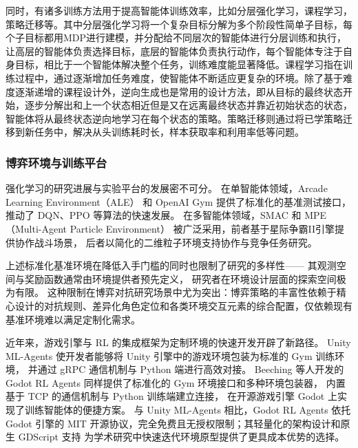 \documentclass[12pt, a4paper, UTF8]{ctexart}
\numberwithin{equation}{section}
\begin{document}
同时，有诸多训练方法用于提高智能体训练效率，比如分层强化学习\cite{10120651hierarchical}，课程学习\cite{2009Curriculum}，策略迁移\cite{Tseng2022OfflineMR}等。其中分层强化学习将一个复杂目标分解为多个阶段性简单子目标，每个子目标都用MDP进行建模，并分配给不同层次的智能体进行分层训练和执行，让高层的智能体负责选择目标，底层的智能体负责执行动作，每个智能体专注于自身目标，相比于一个智能体解决整个任务，训练难度能显著降低。课程学习指在训练过程中，通过逐渐增加任务难度，使智能体不断适应更复杂的环境。除了基于难度逐渐递增的课程设计外，逆向生成也是常用的设计方法，即从目标的最终状态开始，逐步分解出和上一个状态相近但是又在远离最终状态并靠近初始状态的状态，智能体将从最终状态逆向地学习在每个状态的策略。策略迁移则通过将已学策略迁移到新任务中，解决从头训练耗时长，样本获取率和利用率低等问题。

\subsubsection{博弈环境与训练平台}

强化学习的研究进展与实验平台的发展密不可分。
在单智能体领域，Arcade Learning Environment（ALE）\cite{bellemare2013arcade} 和
OpenAI Gym\cite{1606.01540Gym} 提供了标准化的基准测试接口，
推动了 DQN、PPO 等算法的快速发展。
在多智能体领域，SMAC\cite{samvelyan2019starcraftmultiagentchallenge}
和 MPE（Multi-Agent Particle Environment）\cite{mordatch2018emergencegroundedcompositionallanguage}
被广泛采用，前者基于星际争霸II引擎提供协作战斗场景，
后者以简化的二维粒子环境支持协作与竞争任务研究。

上述标准化基准环境在降低入手门槛的同时也限制了研究的多样性——
其观测空间与奖励函数通常由环境提供者预先定义，
研究者在环境设计层面的探索空间极为有限。
这种限制在博弈对抗研究场景中尤为突出：博弈策略的丰富性依赖于精心设计的对抗规则、差异化角色定位和各类环境交互元素的综合配置，仅依赖现有基准环境难以满足定制化需求。

近年来，游戏引擎与 RL 的集成框架为定制环境的快速开发开辟了新路径。
Unity ML-Agents\cite{juliani2020unitygeneralplatformintelligent}
使开发者能够将 Unity 引擎中的游戏环境包装为标准的 Gym 训练环境，
并通过 gRPC 通信机制与 Python 端进行高效对接。
Beeching 等人开发的 Godot RL Agents\cite{beeching2021godotrlagents}
同样提供了标准化的 Gym 环境接口和多种环境包装器，
内置基于 TCP 的通信机制与 Python 训练端建立连接，
在开源游戏引擎 Godot 上实现了训练智能体的便捷方案。
与 Unity ML-Agents 相比，Godot RL Agents 依托 Godot 引擎的 MIT 开源协议，完全免费且无授权限制；其轻量化的架构设计和原生 GDScript 支持
为学术研究中快速迭代环境原型提供了更具成本优势的选择。
\end{document}
